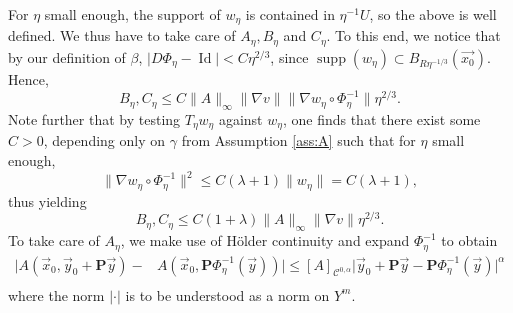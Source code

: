\documentclass[a4paper,reqno]{amsart}
\numberwithin{equation}{section}
\numberwithin{equation}{section}		%
\numberwithin{figure}{section}			%
\numberwithin{table}{section}				%
\theoremstyle{definition}
\newcommand{\<}{\ensuremath \leq}
\renewcommand{\>}{\ensuremath \geq}
\begin{document}
For $\eta$ small enough, the support of $w_\eta$ is contained in $\eta^{-1}U$, so the above is well defined. We thus have to take care of $A_\eta,B_\eta$ and $C_\eta$. To this end, we notice that by our definition of $\beta$, $\lvert D\Phi_\eta - \operatorname{Id}\rvert < C\eta^{2/3}$, since $\operatorname{supp}(w_\eta)\subset B_{R\eta^{-1/3}}(\vec{x_0})$. Hence,
\begin{equation}
    B_\eta ,C_\eta\leq C\lVert A\rVert_\infty\lVert \nabla v\rVert \lVert \nabla w_\eta\circ\Phi_\eta^{-1}\rVert\eta^{2/3}.
\end{equation}
Note further that by testing $T_\eta w_\eta$ against $w_\eta$, one finds that there exist some $C>0$, depending only on $\gamma$ from Assumption \ref{ass:A} such that for $\eta$  small enough,
\begin{equation}
    \lVert \nabla w_\eta\circ\Phi_\eta^{-1}\rVert^2\leq C(\lambda + 1)\lVert w_\eta\rVert =C(\lambda + 1),
\end{equation}
thus yielding
\begin{equation}
    B_\eta ,C_\eta\leq C(1+\lambda)\lVert A\rVert_\infty\lVert \nabla v\rVert \eta^{2/3}.
\end{equation}
To take care of $A_\eta$, we make use of Hölder continuity and expand $\Phi_\eta^{-1}$ to obtain
\begin{equation}
    \begin{aligned}
        \lvert A\left(\vec{x}_0, \vec{y}_0  +\textbf{P}\vec{y}\right) - &A\left(\vec{x}_0, \textbf{P}\Phi_\eta^{-1}(\vec{y})\right)\lvert\leq [A]_{\mathcal{C}^{0,\alpha}}\lvert\vec{y}_0 + \textbf{P}\vec{y} - \textbf{P}\Phi_\eta^{-1}(\vec{y})\rvert^\alpha\\
    \end{aligned}
\end{equation}
where the norm $\lvert \cdot \rvert$ is to be understood as a norm on $Y^m$.
\end{document}
